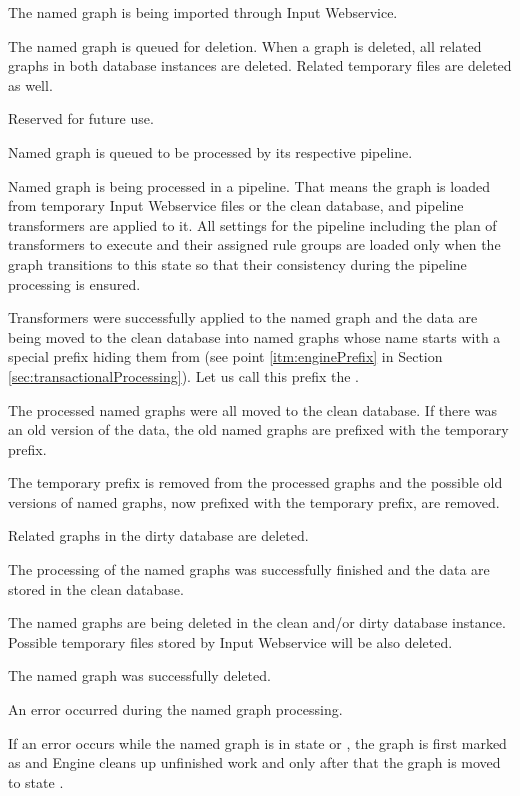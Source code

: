 \begin{description}[style=nextline,font=\ttfamily]
  \item[IMPORTING] The named graph is being imported through Input Webservice.
  \item[QUEUED\_FOR\_DELETE] The named graph is queued for deletion. When a graph is deleted, all related graphs in both database instances are deleted. Related temporary files are deleted as well.
  \item[QUEUED\_URGENT] Reserved for future use.
  \item[QUEUED] Named graph is queued to be processed by its respective pipeline.
  \item[PROCESSING] Named graph is  being processed in a pipeline. That means the graph is loaded from temporary Input Webservice files or the clean database, and pipeline transformers are applied to it. All settings for the pipeline including the plan of transformers to execute and their assigned rule groups are loaded only when the graph transitions to this state so that their consistency during the pipeline processing is ensured.
  \item[PROCESSED] Transformers were successfully applied to the named graph and the data are being moved to the clean database into named graphs whose name starts with a special prefix hiding them from \QE (see point \ref{itm:enginePrefix} in Section \ref{sec:transactionalProcessing}). Let us call this prefix the .
  \item[PROPAGATED] The processed named graphs were all moved to the clean database. If there was an old version of the data, the old named graphs are prefixed with the temporary prefix.
  \item[OLDGRAPHSPREFIXED] The temporary prefix is removed from the processed graphs and the possible old versions of named graphs, now prefixed with the temporary prefix, are removed.
  \item[NEWGRAPHSPREPARED] Related graphs in the dirty database are deleted.
  \item[FINISHED] The processing of the named graphs was successfully finished and the data are stored in the clean database.
  \item[DELETING] The named graphs are being deleted in the clean and/or dirty database instance. Possible temporary files stored by Input Webservice will be also deleted.
  \item[DELETED] The named graph was successfully deleted.
  \item[WRONG] An error occurred during the named graph processing.
  \item[DIRTY] If an error occurs while the named graph is in state  or , the graph is first marked as  and Engine cleans up unfinished work and only after that the graph is moved to state .
\end{description}

